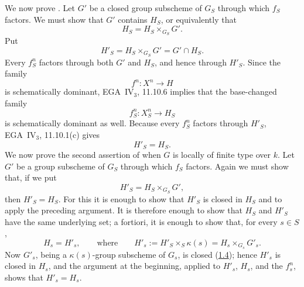 We now prove \textup{}. Let \(G'\) be a closed group
subscheme of \(G_S\) through which \(f_S\) factors. We must show
that \(G'\) contains \(H_S\), or equivalently that
\[
  H_S=H_S\times_{G_S}G'.
\]
Put
\[
  H'_S=H_S\times_{G_S}G'=G'\cap H_S.
\]
Every \(f^n_S\) factors through both \(G'\) and \(H_S\), and
hence through \(H'_S\). Since the family
\[
  f^n:X^n\longrightarrow H
\]
is schematically dominant, EGA~IV\(_3\), 11.10.6 implies that
the base-changed family
\[
  f^n_S:X^n_S\longrightarrow H_S
\]
is schematically dominant as well. Because every \(f^n_S\)
factors through \(H'_S\), EGA~IV\(_3\), 11.10.1\textup{(c)}
gives
\[
  H'_S=H_S.
\]
We now prove the second assertion of \textup{} when \(G\) is
locally of finite type over \(k\). Let \(G'\) be a group
subscheme of \(G_S\) through which \(f_S\) factors. Again we must
show that, if we put
\[
  H'_S=H_S\times_{G_S}G',
\]
then \(H'_S=H_S\). For this it is enough to show that \(H'_S\) is
closed in \(H_S\) and to apply the preceding argument. It is
therefore enough to show that \(H_S\) and \(H'_S\) have the same
underlying set; a fortiori, it is enough to show that, for every
\(s\in S\),
\[
  H_s=H'_s,
  \qquad\text{where}\qquad
  H'_s:=H'_S\times_S\kappa(s)=H_s\times_{G_s}G'_s.
\]
Now \(G'_s\), being a \(\kappa(s)\)-group subscheme of \(G_s\), is
closed (\hyperref[prop:sga3-VIB-1.4]{1.4}); hence \(H'_s\) is closed
in \(H_s\), and the argument at the beginning, applied to
\(H'_s\), \(H_s\), and the \(f^n_s\), shows that \(H'_s=H_s\).

